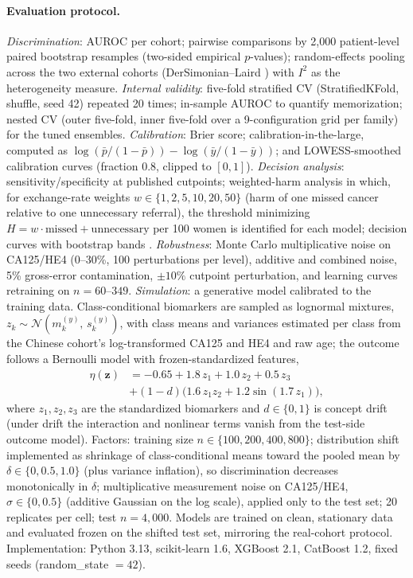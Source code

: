 \documentclass[pmlr,twocolumn,10pt]{jmlr} %
\begin{document}
\paragraph{Evaluation protocol.} \emph{Discrimination}: AUROC per cohort;
pairwise comparisons by 2{,}000 patient-level paired bootstrap resamples
(two-sided empirical $p$-values); random-effects pooling across the two
external cohorts (DerSimonian--Laird \citep{dersimonian1986}) with $I^2$ as
the heterogeneity measure. \emph{Internal validity}: five-fold stratified
CV (StratifiedKFold, shuffle, seed 42) repeated 20 times; in-sample AUROC to quantify memorization; nested CV
(outer five-fold, inner five-fold over a 9-configuration grid per family)
for the tuned ensembles. \emph{Calibration}: Brier score; calibration-in-the-large, computed as
$\log(\bar{p}/(1-\bar{p})) - \log(\bar{y}/(1-\bar{y}))$; and LOWESS-smoothed
calibration curves (fraction 0.8, clipped to $[0,1]$). \emph{Decision
analysis}: sensitivity/specificity at published cutpoints; weighted-harm
analysis in which, for exchange-rate weights
$w\in\{1,2,5,10,20,50\}$ (harm of one missed cancer relative to one
unnecessary referral), the threshold minimizing
$H=w\cdot\text{missed}+\text{unnecessary}$ per 100 women is identified for
each model; decision curves with bootstrap bands \citep{vickers2006}.
\emph{Robustness}: Monte Carlo multiplicative noise on CA125/HE4 (0--30\%,
100 perturbations per level), additive and combined noise, 5\%
gross-error contamination, $\pm10\%$ cutpoint perturbation, and learning
curves retraining on $n=60$--$349$. \emph{Simulation}: a generative model
calibrated to the training data. Class-conditional biomarkers are sampled
as lognormal mixtures, $z_{k}\sim\mathcal{N}(m_{k}^{(y)},\,s_{k}^{(y)})$,
with class means and variances estimated per class from the Chinese
cohort's log-transformed CA125 and HE4 and raw age; the outcome follows a
Bernoulli model with frozen-standardized features,
\begin{equation}
\begin{split}
\eta(\mathbf{z}) &= -0.65 + 1.8\,z_{1} + 1.0\,z_{2} + 0.5\,z_{3}\\
& + (1-d)\bigl(1.6\,z_{1}z_{2} + 1.2\sin(1.7\,z_{1})\bigr),
\end{split}
\label{eq:eta}
\end{equation}
where $z_{1},z_{2},z_{3}$ are the standardized biomarkers and $d\in\{0,1\}$
is concept drift (under drift the interaction and nonlinear terms vanish
from the test-side outcome model). Factors: training size
$n\in\{100,200,400,800\}$; distribution shift implemented as shrinkage of
class-conditional means toward the pooled mean by $\delta\in\{0,0.5,1.0\}$
(plus variance inflation), so discrimination decreases monotonically in
$\delta$; multiplicative measurement noise on CA125/HE4,
$\sigma\in\{0,0.5\}$ (additive Gaussian on the log scale), applied only to
the test set; 20 replicates per cell; test $n=4{,}000$. Models are trained
on clean, stationary data and evaluated frozen on the shifted test set,
mirroring the real-cohort protocol. Implementation: Python 3.13,
scikit-learn 1.6, XGBoost 2.1, CatBoost 1.2, fixed seeds
(random\_state $=42$).
\end{document}
